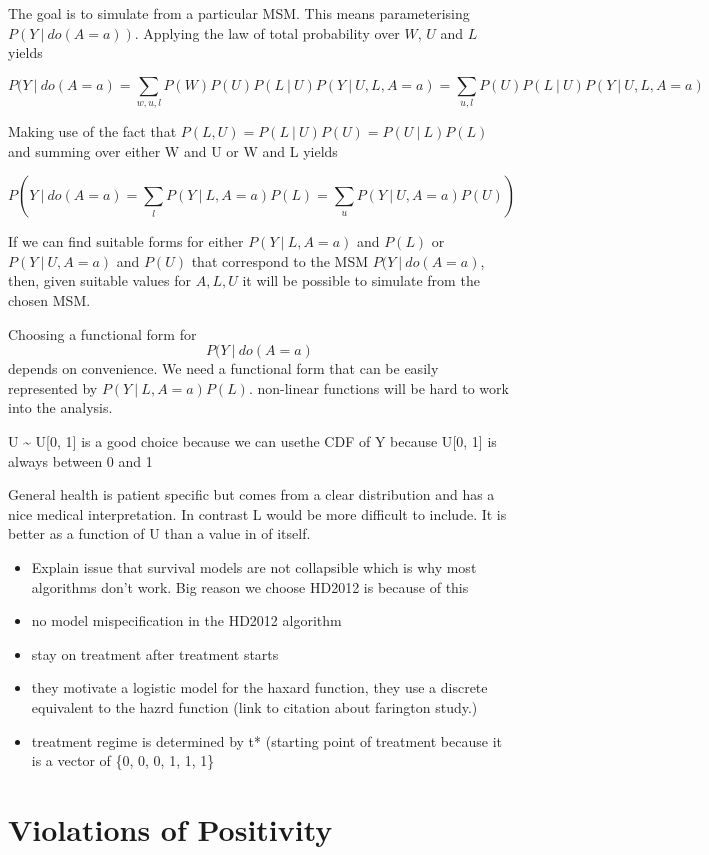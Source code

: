 \documentclass[11pt]{article}
\providecommand{\tightlist}{%
      \setlength{\itemsep}{0pt}\setlength{\parskip}{0pt}}
\begin{document}
The goal is to simulate from a particular MSM. This means parameterising
\(P(Y\ |\ do(A=a))\). Applying the law of total probability over \(W\),
\(U\) and \(L\) yields

\[P(Y\ |\ do(A=a) = \sum_{w, u, l} P(W)P(U)P(L\ |\ U)P(Y\ |\ U, L, A=a) = \sum_{u, l} P(U)P(L\ |\ U)P(Y\ |\ U, L, A=a)\]

Making use of the fact that
\(P(L, U) = P(L\ |\  U)P(U) = P(U\ |\ L)P(L)\) and summing over either W
and U or W and L yields

\[P(Y\ |\ do(A=a) = \sum_{l}P(Y\ |\ L, A=a)P(L) = \sum_{u} P(Y\ |\ U, A=a)P(U))\]

If we can find suitable forms for either \(P(Y\ |\ L, A=a)\) and
\(P(L)\) or \(P(Y\ |\ U, A=a)\) and \(P(U)\) that correspond to the MSM
\(P(Y\ |\ do(A=a)\), then, given suitable values for \(A, L, U\) it will
be possible to simulate from the chosen MSM.

Choosing a functional form for \[P(Y\ |\ do(A=a)\] depends on
convenience. We need a functional form that can be easily represented by
\(P(Y\ |\ L, A=a)P(L)\). non-linear functions will be hard to work into
the analysis.

U \textasciitilde{} U{[}0, 1{]} is a good choice because we can usethe
CDF of Y because U{[}0, 1{]} is always between 0 and 1

General health is patient specific but comes from a clear distribution
and has a nice medical interpretation. In contrast L would be more
difficult to include. It is better as a function of U than a value in of
itself.

\begin{itemize}
\tightlist
\item
  Explain issue that survival models are not collapsible which is why
  most algorithms don't work. Big reason we choose HD2012 is because of
  this
\item
  no model mispecification in the HD2012 algorithm
\item
  stay on treatment after treatment starts
\item
  they motivate a logistic model for the haxard function, they use a
  discrete equivalent to the hazrd function (link to citation about
  farington study.)
\item
  treatment regime is determined by t* (starting point of treatment
  because it is a vector of \{0, 0, 0, 1, 1, 1\}
\end{itemize}

    \section{Violations of Positivity}\label{violations-of-positivity}
\end{document}
